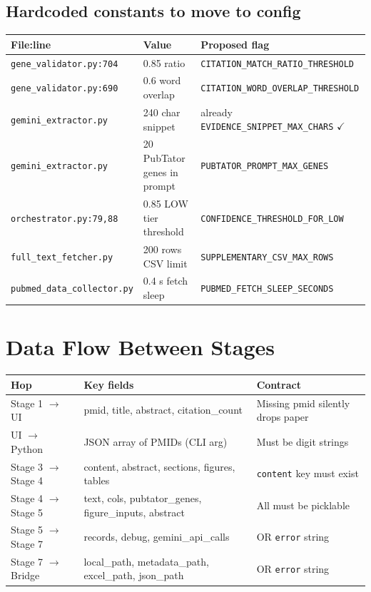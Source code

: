 \documentclass[11pt,a4paper]{article}
\begin{document}
\subsection{Hardcoded constants to move to config}

\begin{center}
\begin{tabular}{lll}
\toprule
\textbf{File:line} & \textbf{Value} & \textbf{Proposed flag} \\
\midrule
\texttt{gene\_validator.py:704} & 0.85 ratio & \texttt{CITATION\_MATCH\_RATIO\_THRESHOLD} \\
\texttt{gene\_validator.py:690} & 0.6 word overlap & \texttt{CITATION\_WORD\_OVERLAP\_THRESHOLD} \\
\texttt{gemini\_extractor.py} & 240 char snippet & already \texttt{EVIDENCE\_SNIPPET\_MAX\_CHARS} $\checkmark$ \\
\texttt{gemini\_extractor.py} & 20 PubTator genes in prompt & \texttt{PUBTATOR\_PROMPT\_MAX\_GENES} \\
\texttt{orchestrator.py:79,88} & 0.85 LOW tier threshold & \texttt{CONFIDENCE\_THRESHOLD\_FOR\_LOW} \\
\texttt{full\_text\_fetcher.py} & 200 rows CSV limit & \texttt{SUPPLEMENTARY\_CSV\_MAX\_ROWS} \\
\texttt{pubmed\_data\_collector.py} & 0.4 s fetch sleep & \texttt{PUBMED\_FETCH\_SLEEP\_SECONDS} \\
\bottomrule
\end{tabular}
\end{center}

\section{Data Flow Between Stages}

\begin{center}
\begin{tabular}{lll}
\toprule
\textbf{Hop} & \textbf{Key fields} & \textbf{Contract} \\
\midrule
Stage 1 $\to$ UI & pmid, title, abstract, citation\_count & Missing pmid silently drops paper \\
UI $\to$ Python & JSON array of PMIDs (CLI arg) & Must be digit strings \\
Stage 3 $\to$ Stage 4 & content, abstract, sections, figures, tables & \texttt{content} key must exist \\
Stage 4 $\to$ Stage 5 & text, cols, pubtator\_genes, figure\_inputs, abstract & All must be picklable \\
Stage 5 $\to$ Stage 7 & records, debug, gemini\_api\_calls & OR \texttt{error} string \\
Stage 7 $\to$ Bridge & local\_path, metadata\_path, excel\_path, json\_path & OR \texttt{error} string \\
\bottomrule
\end{tabular}
\end{center}
\end{document}
